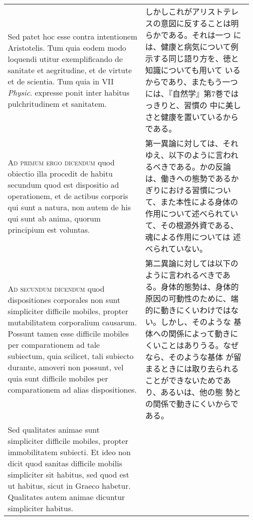 \documentclass[10pt]{jsarticle} %
\begin{document}
\begin{longtable}{p{21em}p{21em}}
\\


Sed patet hoc esse contra intentionem Aristotelis. Tum quia eodem modo
loquendi utitur exemplificando de sanitate et aegritudine, et de
virtute et de scientia. Tum quia in VII {\itshape Physic}. expresse ponit inter
habitus pulchritudinem et sanitatem.


&

しかしこれがアリストテレスの意図に反することは明らかである。それは一つ
には、健康と病気について例示する同じ語り方を、徳と知識についても用いて
いるからであり、またもう一つには、『自然学』第7巻ではっきりと、習慣の
中に美しさと健康を置いているからである。

\\



{\scshape Ad primum ergo dicendum} quod obiectio illa procedit de habitu secundum
quod est dispositio ad operationem, et de actibus corporis qui sunt a
natura, non autem de his qui sunt ab anima, quorum principium est
voluntas.


&

第一異論に対しては、それゆえ、以下のように言われるべきである。かの反論
は、働きへの態勢であるかぎりにおける習慣について、また本性による身体の
作用について述べられていて、その根源外資である、魂による作用については
述べられていない。


\\



{\scshape Ad secundum dicendum} quod dispositiones corporales non sunt
simpliciter difficile mobiles, propter mutabilitatem corporalium
causarum. Possunt tamen esse difficile mobiles per comparationem ad
tale subiectum, quia scilicet, tali subiecto durante, amoveri non
possunt, vel quia sunt difficile mobiles per comparationem ad alias
dispositiones. 



&

第二異論に対しては以下のように言われるべきである。身体的態勢は、身体的
原因の可動性のために、端的に動きにくいわけではない。しかし、そのような
基体への関係によって動きにくいことはありうる。なぜなら、そのような基体
が留まるときには取り去られることができないためであり、あるいは、他の態
勢との関係で動きにくいからである。

\\


Sed qualitates animae sunt simpliciter difficile
mobiles, propter immobilitatem subiecti. Et ideo non dicit quod
sanitas difficile mobilis simpliciter sit habitus, sed quod est ut
habitus, sicut in Graeco habetur. Qualitates autem animae dicuntur
simpliciter habitus.



\end{longtable}
\end{document}
